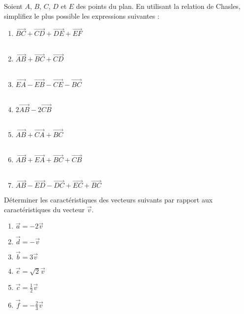 \begin{exercice}
Soient $A$, $B$, $C$, $D$ et $E$ des points du plan. En utilisant la relation de Chasles, simplifiez le plus possible les expressions suivantes : 
\begin{enumerate}

\item $\overrightarrow{BC}+\overrightarrow{CD}+\overrightarrow{DE}+\overrightarrow{EF}$    \\\\
\item $\overrightarrow{AB}+\overrightarrow{BC}+\overrightarrow{CD}$ \\\\    
\item $\overrightarrow{EA}-\overrightarrow{EB}-\overrightarrow{CE}-\overrightarrow{BC}$\\\\
\item $2\overrightarrow{AB}-2\overrightarrow{CB}$\\\\
\item $\overrightarrow{AB}+\overrightarrow{CA}+\overrightarrow{BC}$\\\\
 \item $\overrightarrow{AB}+\overrightarrow{EA}+\overrightarrow{BC}+\overrightarrow{CB}$\\\\
 \item $\overrightarrow{AB}-\overrightarrow{ED}-\overrightarrow{DC}+\overrightarrow{EC}+\overrightarrow{BC}$
 
\end{enumerate}
\end{exercice}

\begin{exercice}
Déterminer les caractéristiques des vecteurs suivants par rapport aux caractéristiques du vecteur $\overrightarrow{v}$.\\
\begin{multicols}{2}
\begin{enumerate}
\item $\overrightarrow{a}=-2\overrightarrow{v}$
\item $\overrightarrow{d}=-\overrightarrow{v}$ 
\item $\overrightarrow{b}=3\overrightarrow{v}$
\item $\overrightarrow{e}=\sqrt{2}\overrightarrow{v}$
\item $\overrightarrow{c}=\frac{1}{2}\overrightarrow{v}$
\item $\overrightarrow{f}=-\frac{2}{3}\overrightarrow{v}$  
\end{enumerate}
\end{multicols}
\end{exercice}

